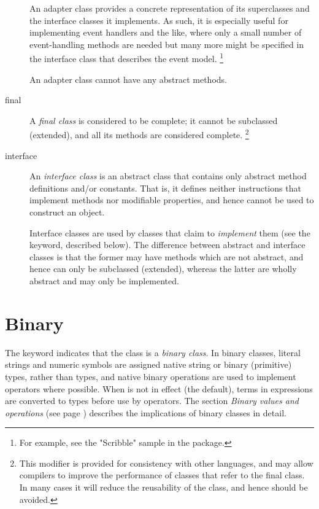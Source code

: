\begin{description}
An adapter class provides a concrete representation of its superclasses
and the interface classes it implements.  As such, it is especially
useful for implementing event handlers and the like, where only a small
number of event-handling methods are needed but many more might be
specified in the interface class that describes the event model.
\footnote{
For example, see the "Scribble" sample in the \nr{} package.
}
 
An adapter class cannot have any abstract methods.
\item[final]

A \emph{final class} is considered to be complete; it cannot be
subclassed (extended), and all its methods are considered complete.
\footnote{
This modifier is provided for consistency with other languages, and may
allow compilers to improve the performance of classes that refer to the
final class.
In many cases it will reduce the reusability of the class, and hence
should be avoided.
}
\item[interface]\label{refinterf}

An \emph{interface class} is an abstract class that contains only
abstract method definitions and/or constants.  That is, it defines
neither instructions that implement methods nor modifiable properties,
and hence cannot be used to construct an object.
 
Interface classes are used by classes that claim to \emph{implement}
them (see the  keyword, described below).
The difference between abstract and interface classes is that
the former may have methods which are not abstract, and hence can only
be subclassed (extended), whereas the latter are wholly abstract and
may only be implemented.
\end{description}
\section{Binary}\label{refbincla}
 
The keyword  indicates that the class is a \emph{binary
class}.
In binary classes, literal strings and numeric symbols are assigned
native string or binary (primitive) types, rather than \nr{} types,
and native binary operations are used to implement operators where
possible.
When  is not in effect (the default), terms in
expressions are converted to \nr{} types before use by operators.
The section  \emph{Binary values and operations} (see page \pageref{refbinary}) 
describes the implications of binary classes in detail.
 
